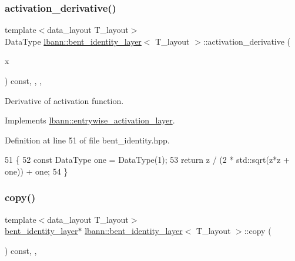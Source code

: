 \subsubsection{\texorpdfstring{activation\+\_\+derivative()}{activation\_derivative()}}
{\footnotesize\ttfamily template$<$data\+\_\+layout T\+\_\+layout$>$ \\
Data\+Type \hyperlink{classlbann_1_1bent__identity__layer}{lbann\+::bent\+\_\+identity\+\_\+layer}$<$ T\+\_\+layout $>$\+::activation\+\_\+derivative (\begin{DoxyParamCaption}\item[{Data\+Type}]{x }\end{DoxyParamCaption}) const\hspace{0.3cm}{\ttfamily [inline]}, {\ttfamily [override]}, {\ttfamily [protected]}, {\ttfamily [virtual]}}

Derivative of activation function. 

Implements \hyperlink{classlbann_1_1entrywise__activation__layer_a7676a4c5060452a38264993554e79f8e}{lbann\+::entrywise\+\_\+activation\+\_\+layer}.



Definition at line 51 of file bent\+\_\+identity.\+hpp.


\begin{DoxyCode}
51                                                             \{
52     \textcolor{keyword}{const} DataType one = DataType(1);
53     \textcolor{keywordflow}{return} z / (2 * std::sqrt(z*z + one)) + one;
54   \}
\end{DoxyCode}
\mbox{\label{classlbann_1_1bent__identity__layer_aab5919fa670a2d93045c723f7dfce5ab}} 
\subsubsection{\texorpdfstring{copy()}{copy()}}
{\footnotesize\ttfamily template$<$data\+\_\+layout T\+\_\+layout$>$ \\
\hyperlink{classlbann_1_1bent__identity__layer}{bent\+\_\+identity\+\_\+layer}$\ast$ \hyperlink{classlbann_1_1bent__identity__layer}{lbann\+::bent\+\_\+identity\+\_\+layer}$<$ T\+\_\+layout $>$\+::copy (\begin{DoxyParamCaption}{ }\end{DoxyParamCaption}) const\hspace{0.3cm}{\ttfamily [inline]}, {\ttfamily [override]}, {\ttfamily [virtual]}}

